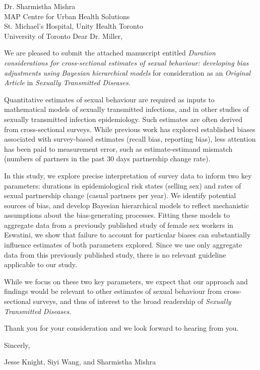\address{
  Dr. William C. Miller\\
  Editor-in-Chief\\
  Sexually Transmitted Diseases
}{Dr. Sharmistha Mishra\\
  MAP Centre for Urban Health Solutions\\
  St. Michael's Hospital, Unity Health Toronto\\
  University of Toronto}
Dear Dr. Miller,
\par
We are pleased to submit the attached manuscript entitled
\emph{Duration considerations for cross-sectional estimates of sexual behaviour:
  developing bias adjustments using Bayesian hierarchical models}
for consideration as an \emph{Original Article} in \emph{Sexually Transmitted Diseases}.
\par
Quantitative estimates of sexual behaviour are required
as inputs to mathematical models of sexually transmitted infections,
and in other studies of sexually transmitted infection epidemiology.
Such estimates are often derived from cross-sectional surveys.
While previous work has explored established biases associated with survey-based estimates
(\eg recall bias, reporting bias),
less attention has been paid to measurement error, such as estimate-estimand mismatch
(\eg numbers of partners in the past 30 days \vs partnership change rate).
\par
In this study, we explore precise interpretation of survey data to inform two key parameters:
durations in epidemiological risk states (\eg selling sex) and
rates of sexual partnership change (\eg casual partners per year).
We identify potential sources of bias,
and develop Bayesian hierarchical models to reflect
mechanistic assumptions about the bias-generating processes.
Fitting these models to aggregate data from
a previously published study of female sex workers in Eswatini,
we show that failure to account for particular biases can
substantially influence estimates of both parameters explored.
Since we use only aggregate data from this previously published study,
there is no relevant guideline applicable to our study.
\par
While we focus on these two key parameters,
we expect that our approach and findings would be relevant to
other estimates of sexual behaviour from cross-sectional surveys,
and thus of interest to the broad readership of \emph{Sexually Transmitted Diseases}.
\par
Thank you for your consideration and we look forward to hearing from you.
\medskip\par
Sincerly,
\par
Jesse Knight, Siyi Wang, and Sharmistha Mishra
